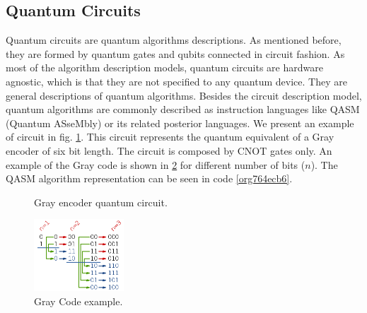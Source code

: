 \subsection*{Quantum Circuits}
\label{sec:org4a75bf4}

Quantum circuits are quantum algorithms descriptions.
As mentioned before, they are formed by quantum gates and qubits connected in circuit fashion.
As most of the algorithm description models, quantum circuits are hardware agnostic, which is that they are not specified to any quantum device.
They are general descriptions of quantum algorithms.
Besides the circuit description model, quantum algorithms are commonly described as instruction languages like QASM (Quantum ASseMbly) \cite{Nielsen_2009} or its related posterior languages.
We present an example of circuit in fig. \ref{fig:circuit_example}.
This circuit represents the quantum equivalent of a Gray encoder of six bit length.
The circuit is composed by CNOT gates only.
An example of the Gray code is shown in \ref{fig:org2a0fe4c} for different number of bits (\(n\)).
The QASM algorithm representation can be seen in code \ref{org764ecb6}.

\begin{figure}
    \centering


\label{fig:circuit_example}
\caption{Gray encoder quantum circuit.}
\end{figure}

\begin{figure}[htbp]
\centering
\includegraphics[width=0.3\textwidth]{figures/gray_code.png}
\caption{\label{fig:org2a0fe4c}
Gray Code example.}
\end{figure}

